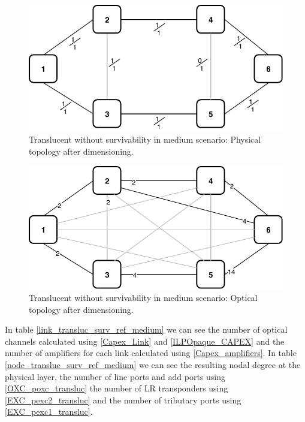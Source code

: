 \begin{figure}[h!]
\centering
\includegraphics[width=12cm]{sdf/ilp/translucent_survivability/figures/physical_topology_medium}
\caption{Translucent without survivability in medium scenario: Physical topology after dimensioning.}
\label{physical3_medium}
\end{figure}

\newpage
\begin{figure}[h!]
\centering
\includegraphics[width=12cm]{sdf/ilp/translucent_survivability/figures/optical_topology_medium}
\caption{Translucent without survivability in medium scenario: Optical topology after dimensioning.}
\label{optical3_medium}
\end{figure}

In table \ref{link_transluc_surv_ref_medium} we can see the number of optical channels calculated using \ref{Capex_Link} and \ref{ILPOpaque_CAPEX} and the number of amplifiers for each link calculated using \ref{Capex_amplifiers}.
In table \ref{node_transluc_surv_ref_medium} we can see the resulting nodal degree at the physical layer, the number of line ports and add ports using \ref{OXC_poxc_transluc} the number of LR transponders using \ref{EXC_pexc2_transluc} and the number of tributary ports using \ref{EXC_pexc1_transluc}.

